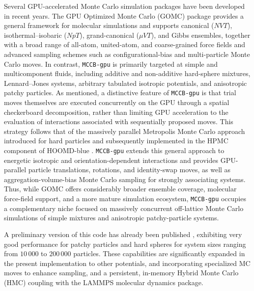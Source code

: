 \documentclass[final,5p,times,twocolumn]{elsarticle}
\begin{document}
Several GPU-accelerated Monte Carlo simulation packages have been
developed in recent years. The GPU Optimized Monte Carlo (GOMC)
package \cite{Nejahi2019GOMC,Nejahi2021GOMC} provides a general
framework for molecular simulations and supports canonical ($NVT$),
isothermal--isobaric ($NpT$), grand-canonical ($\mu VT$), and Gibbs
ensembles, together with a broad range of all-atom, united-atom, and
coarse-grained force fields and advanced sampling schemes such as
configurational-bias and multi-particle Monte Carlo moves. In
contrast, \texttt{MCCB-gpu} is primarily targeted at simple and
multicomponent fluids, including additive and non-additive hard-sphere
mixtures, Lennard--Jones systems, arbitrary tabulated isotropic
potentials, and anisotropic patchy particles. As mentioned, a
distinctive feature of 
\texttt{MCCB-gpu} is that trial moves themselves are executed
concurrently on the GPU through a spatial checkerboard decomposition,
rather than limiting GPU acceleration to the evaluation of
interactions associated with sequentially proposed moves. This
strategy follows that of the massively parallel Metropolis Monte
Carlo approach introduced for hard particles and subsequently
implemented in the HPMC component of HOOMD-blue
\cite{Anderson2016HPMC,Anderson2020HOOMD}. \texttt{MCCB-gpu} extends this general approach
to energetic isotropic and orientation-dependent interactions and
provides GPU-parallel particle translations, rotations, and
identity-swap moves, as well as aggregation-volume-bias Monte Carlo
sampling for strongly associating systems. Thus, while GOMC
offers considerably broader ensemble coverage, molecular force-field
support, and a more mature simulation ecosystem, \texttt{MCCB-gpu}
occupies a complementary niche focused on massively concurrent
off-lattice Monte Carlo simulations of simple mixtures and anisotropic
patchy-particle systems. 

 A preliminary version of this code has already been published
 \cite{MC-GPU}, exhibiting very good performance for patchy particles
 \cite{Noya21, Noya25, Kowaguchi25} and hard spheres
 \cite{MacDowell26} for system sizes ranging from $10\,000$ to
 $200\,000$ particles. These capabilities are significantly expanded
 in the present implementation to other potentials, and incorporating
 specialized MC 
 moves to enhance sampling, and a persistent, in-memory Hybrid Monte
 Carlo (HMC) coupling with the LAMMPS molecular dynamics package. 
\end{document}
